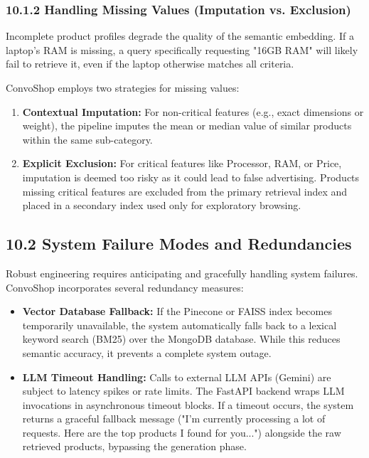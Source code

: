 \subsubsection*{10.1.2 Handling Missing Values (Imputation vs. Exclusion)}
Incomplete product profiles degrade the quality of the semantic embedding. If a laptop's RAM is missing, a query specifically requesting "16GB RAM" will likely fail to retrieve it, even if the laptop otherwise matches all criteria.

ConvoShop employs two strategies for missing values:
\begin{enumerate}
    \item \textbf{Contextual Imputation:} For non-critical features (e.g., exact dimensions or weight), the pipeline imputes the mean or median value of similar products within the same sub-category.
    \item \textbf{Explicit Exclusion:} For critical features like Processor, RAM, or Price, imputation is deemed too risky as it could lead to false advertising. Products missing critical features are excluded from the primary retrieval index and placed in a secondary index used only for exploratory browsing.
\end{enumerate}

\subsection*{10.2 System Failure Modes and Redundancies}
Robust engineering requires anticipating and gracefully handling system failures. ConvoShop incorporates several redundancy measures:

\begin{itemize}
    \item \textbf{Vector Database Fallback:} If the Pinecone or FAISS index becomes temporarily unavailable, the system automatically falls back to a lexical keyword search (BM25) over the MongoDB database. While this reduces semantic accuracy, it prevents a complete system outage.
    \item \textbf{LLM Timeout Handling:} Calls to external LLM APIs (Gemini) are subject to latency spikes or rate limits. The FastAPI backend wraps LLM invocations in asynchronous timeout blocks. If a timeout occurs, the system returns a graceful fallback message ("I'm currently processing a lot of requests. Here are the top products I found for you...") alongside the raw retrieved products, bypassing the generation phase.
\end{itemize}

